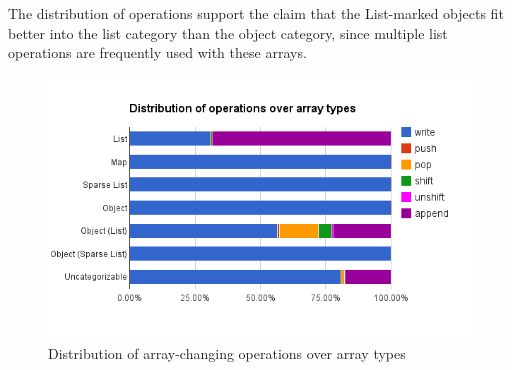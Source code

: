 The distribution of operations support the claim that the List-marked objects fit better into the list category than the object category, since multiple list operations are frequently used with these arrays.

\begin{figure}[htbp]
\centering
\includegraphics[width=\textwidth]{chapters/study/g2.png}
\caption{Distribution of array-changing operations over array types}
\label{fig:type_operations}
\end{figure}